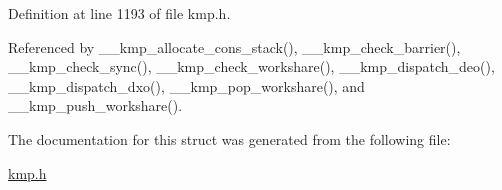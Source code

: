 Definition at line 1193 of file kmp.\-h.



Referenced by \-\_\-\-\_\-kmp\-\_\-allocate\-\_\-cons\-\_\-stack(), \-\_\-\-\_\-kmp\-\_\-check\-\_\-barrier(), \-\_\-\-\_\-kmp\-\_\-check\-\_\-sync(), \-\_\-\-\_\-kmp\-\_\-check\-\_\-workshare(), \-\_\-\-\_\-kmp\-\_\-dispatch\-\_\-deo(), \-\_\-\-\_\-kmp\-\_\-dispatch\-\_\-dxo(), \-\_\-\-\_\-kmp\-\_\-pop\-\_\-workshare(), and \-\_\-\-\_\-kmp\-\_\-push\-\_\-workshare().



The documentation for this struct was generated from the following file\-:\begin{DoxyCompactItemize}
\item 
\hyperlink{kmp_8h}{kmp.\-h}\end{DoxyCompactItemize}
